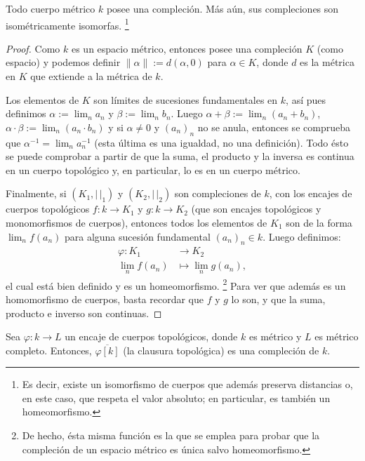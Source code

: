 \documentclass[teoria-numeros.tex]{subfiles}
\begin{document}
\begin{thm}\label{thm:metric_fld_completion}
	Todo cuerpo métrico $k$ posee una compleción.
	Más aún, sus compleciones son isométricamente isomorfas.%
	\footnote{Es decir, existe un isomorfismo de cuerpos que además preserva distancias o, en este caso, que respeta el valor absoluto;
		en particular, es también un homeomorfismo.}
\end{thm}
\begin{proof}
	Como $k$ es un espacio métrico, entonces posee una compleción $K$ (como espacio) y podemos definir $\| \alpha \| := d(\alpha, 0)$ para $\alpha \in K$,
	donde $d$ es la métrica en $K$ que extiende a la métrica de $k$.

	Los elementos de $K$ son límites de sucesiones fundamentales en $k$, así pues definimos $\alpha := \lim_n a_n$ y $\beta := \lim_n b_n$.
	Luego $\alpha + \beta := \lim_n (a_n + b_n)$, $\alpha\cdot\beta := \lim_n (a_n\cdot b_n)$ y si $\alpha \ne 0$ y $(a_n)_n$ no se anula,
	entonces se comprueba que $\alpha^{-1} = \lim_n a_n^{-1}$ (esta última es una igualdad, no una definición).
	Todo ésto se puede comprobar a partir de que la suma, el producto y la inversa es continua en un cuerpo topológico y, en particular, lo es
	en un cuerpo métrico.

	Finalmente, si $(K_1, |\,|_1)$ y $(K_2, |\,|_2)$ son compleciones de $k$, con los encajes de cuerpos topológicos $f\colon k \to K_1$ y $g\colon k \to K_2$
	(que son encajes topológicos y monomorfismos de cuerpos),
	entonces todos los elementos de $K_1$ son de la forma $\lim_n f(a_n)$ para alguna sucesión fundamental $(a_n)_n \in k$.
	Luego definimos:
	\begin{align*}
		\varphi \colon K_1 &\longrightarrow K_2 \\
		\lim_n f(a_n) &\longmapsto \lim_n g(a_n),
	\end{align*}
	el cual está bien definido y es un homeomorfismo.%
	\footnote{De hecho, ésta misma función es la que se emplea para probar que la compleción de un espacio métrico es única salvo homeomorfismo.}
	Para ver que además es un homomorfismo de cuerpos, basta recordar que $f$ y $g$ lo son, y que la suma, producto e inverso son continuas.
\end{proof}

\begin{cor}
	Sea $\varphi\colon k \to L$ un encaje de cuerpos topológicos, donde $k$ es métrico y $L$ es métrico completo.
	Entonces, $\overline{\varphi[k]}$ (la clausura topológica) es una compleción de $k$.
\end{cor}
\end{document}
